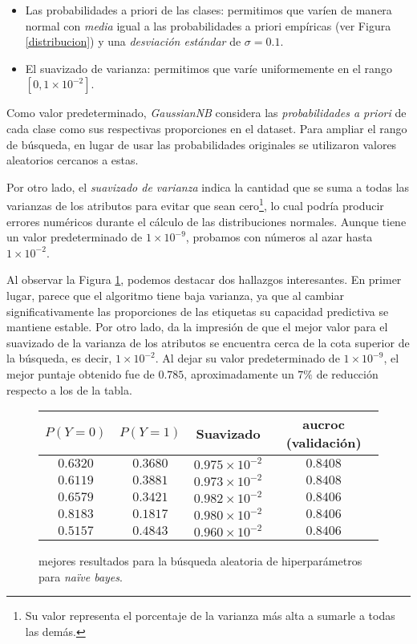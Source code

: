 \begin{itemize}
    \item Las probabilidades a priori de las clases: permitimos que varíen de manera normal con \textit{media} igual a las probabilidades a priori empíricas (ver Figura \ref{distribucion}) y una \textit{desviación estándar} de $\sigma = 0.1$.
    \item El suavizado de varianza: permitimos que varíe uniformemente en el rango $[0, 1 \times 10^{-2}]$.
\end{itemize}

Como valor predeterminado, \textit{GaussianNB} considera las \textit{probabilidades a priori} de cada clase como sus respectivas proporciones en el dataset. Para ampliar el rango de búsqueda, en lugar de usar las probabilidades originales se utilizaron valores aleatorios cercanos a estas.

Por otro lado, el \textit{suavizado de varianza} indica la cantidad que se suma a todas las varianzas de los atributos para evitar que sean cero\footnote{Su valor representa el porcentaje de la varianza más alta a sumarle a todas las demás.}, lo cual podría producir errores numéricos durante el cálculo de las distribuciones normales. Aunque tiene un valor predeterminado de $1 \times 10^{-9}$, probamos con números al azar hasta $1 \times 10^{-2}$.

Al observar la Figura \ref{naive_bayes}, podemos destacar dos hallazgos interesantes. En primer lugar, parece que el algoritmo tiene baja varianza, ya que al cambiar significativamente las proporciones de las etiquetas su capacidad predictiva se mantiene estable. Por otro lado, da la impresión de que el mejor valor para el suavizado de la varianza de los atributos se encuentra cerca de la cota superior de la búsqueda, es decir, $1 \times 10^{-2}$. Al dejar su valor predeterminado de $1 \times 10^{-9}$, el mejor puntaje obtenido fue de $0.785$, aproximadamente un $7\%$ de reducción respecto a los de la tabla.

\vspace{0.5em}
\begin{figure}[!htbp]
    \begin{center}
        \begin{tabular}{ |c|c|c|c| } 
         \hline
        $P(Y=0)$ & $P(Y=1)$ & Suavizado & aucroc (validación) \\
        \hline
        $0.6320$ & $0.3680$ & $0.975 \times 10^{-2}$ & $0.8408$ \\ 
        $0.6119$ & $0.3881$ & $0.973 \times 10^{-2}$ & $0.8408$  \\
        $0.6579$ & $0.3421$ & $0.982 \times 10^{-2}$ & $0.8406$  \\ 
        $0.8183$ & $0.1817$ & $0.980 \times 10^{-2}$ & $0.8406$  \\
        $0.5157$ & $0.4843$ & $0.960 \times 10^{-2}$ & $0.8406$  \\ 
        \hline
        \end{tabular}
    \end{center}
    \caption{mejores resultados para la búsqueda aleatoria de hiperparámetros para \textit{naïve bayes}.} \label{naive_bayes}
\end{figure}

